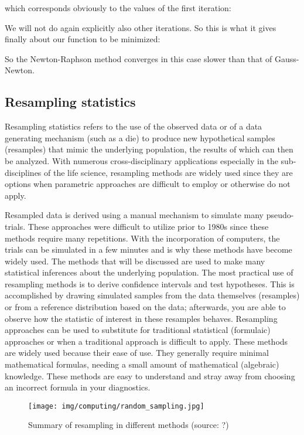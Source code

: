 	which corresponds obviously to the values of the first iteration:
	
	We will not do again explicitly also other iterations. So this is what it gives finally about our function to be minimized:
	
	So the Newton-Raphson method converges in this case slower than that of Gauss-Newton.
	
	\pagebreak

	\subsection{Resampling statistics}	
	Resampling statistics refers to the use of the observed data or of a data generating mechanism (such as a die) to produce new hypothetical samples (resamples) that mimic the underlying population, the results of which can then be analyzed. With numerous cross-disciplinary applications especially in the sub-disciplines of the life science, resampling methods are widely used since they are options when parametric approaches are difficult to employ or otherwise do not apply. 
	
       Resampled data is derived using a manual mechanism to simulate many pseudo-trials. These approaches were difficult to utilize prior to 1980s since these methods require many repetitions. With the incorporation of computers, the trials can be simulated in a few minutes and is why these methods have become widely used.  The methods that will be discussed are used to make many statistical inferences about the underlying population. The most practical use of resampling methods is to derive confidence intervals and test hypotheses. This is accomplished by drawing simulated samples from the data themselves (resamples) or from a reference distribution based on the data; afterwards, you are able to observe how the statistic of interest in these resamples behaves. Resampling approaches can be used to substitute for traditional statistical (formulaic) approaches or when a traditional approach is difficult to apply. These methods are widely used because their ease of use. They generally require minimal mathematical formulas, needing a small amount of mathematical (algebraic) knowledge. These methods are easy to understand and stray away from choosing an incorrect formula in your diagnostics.
      \begin{figure}[H]
		\centering
		\texttt{[image: img/computing/random\_sampling.jpg]}
		\caption{Summary of resampling in different methods (source: ?)}
	\end{figure}
	
